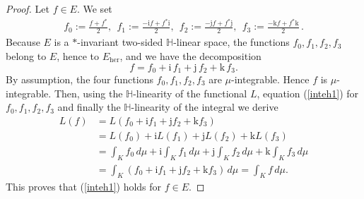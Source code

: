 \documentclass[11pt,a4paper]{amsart}
\theoremstyle{definition}
\begin{document}
\begin{proof}
Let $f\in E$. We set
%
\begin{align*}
f_{0}:=\frac{f+f^{*}}{2}, ~~ f_{1}:=
\frac{- \mathrm{i}f+f^{*} \mathrm{i}}{2}, ~~ f_{2}:=
\frac{- \mathrm{j}f+f^{*}\mathrm{j}}{2},~~ f_{3}:=
\frac{- \mathrm{k}f+f^{*}\mathrm{k}}{2}\, .
\end{align*}
%
Because $E$ is a $*$-invariant two-sided $\mathbb{H}$-linear space, the
functions $f_{0}, f_{1},f_{2},f_{3}$ belong to $E$, hence to
$E_{\mathrm{her}}$, and we have the decomposition
%
\begin{equation*}
f = f_{0} + \mathrm{i}\, f_{1} + \mathrm{j}\, f_{2} + \mathrm{k}\, f_{3}.
\end{equation*}
%
By assumption, the four functions $f_{0}, f_{1},f_{2},f_{3}$ are
$\mu $-integrable. Hence $f$ is $\mu $-integrable. Then, using the
$\mathbb{H}$-linearity of the functional $L$, equation (\ref{inteh1}) for
$f_{0},f_{1},f_{2}, f_{3}$ and finally the $\mathbb{H}$-linearity of the
integral we derive
%
\begin{equation*}
%
\begin{aligned}
L(f) &= L(f_{0} + \mathrm{i}f_{1} + \mathrm{j}f_{2} + \mathrm{k}f_{3})
\\
&= L(f_{0}) + \mathrm{i}L(f_{1}) + \mathrm{j}L(f_{2}) + \mathrm{k}L(f_{3})
\\
&= \int _{K} f_{0} \, d\mu +\mathrm{i}\int _{K} f_{1} \, d\mu +
\mathrm{j}\int _{K} f_{2} \, d\mu + \mathrm{k}\int _{K} f_{3} \, d
\mu
\\
& =\int _{K} (f_{0} + \mathrm{i}f_{1}+ \mathrm{j}f_{2}+ \mathrm{k}f_{3})
\, d\mu = \int _{K} f \, d\mu .
\end{aligned}
%
\end{equation*}
%
This proves that (\ref{inteh1}) holds for $f\in E$.
\end{proof}
\end{document}
